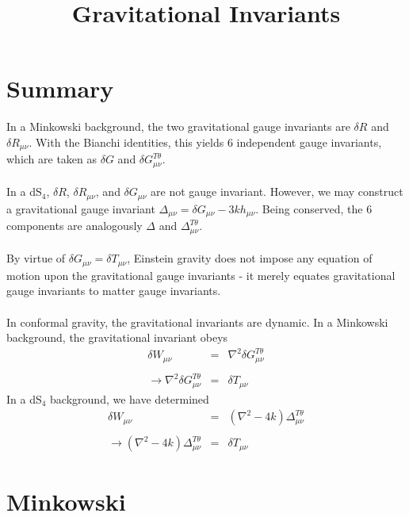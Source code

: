 \documentclass[10pt,letterpaper]{article}
\title{Gravitational Invariants}
\date{}
\numberwithin{equation}{section}
\begin{document}
 
\maketitle
\noindent 
\section{Summary}
In a Minkowski background, the two gravitational gauge invariants are $\delta R$ and $\delta R_{\mu\nu}$. With the Bianchi identities, this yields 6 independent gauge invariants, which are taken as $\delta G$ and $\delta G_{\mu\nu}^{T\theta}$.
\\ \\
In a dS$_4$, $\delta R$, $\delta R_{\mu\nu}$, and $\delta G_{\mu\nu}$ are not gauge invariant. However, we may construct a gravitational gauge invariant $\Delta_{\mu\nu} = \delta G_{\mu\nu} - 3kh_{\mu\nu}$. Being conserved, the 6 components are analogously $\Delta$ and $\Delta_{\mu\nu}^{T\theta}$. 
\\ \\
By virtue of $\delta G_{\mu\nu} = \delta T_{\mu\nu}$, Einstein gravity does not impose any equation of motion upon the gravitational gauge invariants - it merely equates gravitational gauge invariants to matter gauge invariants.
\\ \\
In conformal gravity, the gravitational invariants are dynamic. In a Minkowski background, the gravitational invariant obeys
\begin{eqnarray}
\delta W_{\mu\nu} &=& \nabla^2 \delta G_{\mu\nu}^{T\theta}
\nonumber\\ \nonumber\\
\to \nabla^2 \delta G_{\mu\nu}^{T\theta} &=& \delta T_{\mu\nu}
\end{eqnarray}
In a dS$_4$ background, we have determined
\begin{eqnarray}
\delta W_{\mu\nu} &=& (\nabla^2-4k) \Delta_{\mu\nu}^{T\theta}
\nonumber\\ \nonumber\\
\to (\nabla^2-4k) \Delta_{\mu\nu}^{T\theta} &=& \delta T_{\mu\nu}
\end{eqnarray}


\section{Minkowski}
\end{document}
